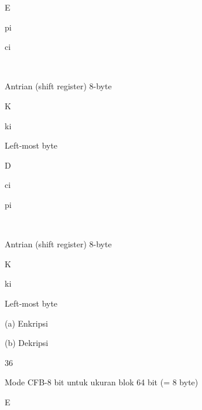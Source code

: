 \documentclass{article}
\begin{document}

E

pi

ci



Antrian (shift register) 8-byte

K

ki

Left-most byte

D

ci

pi



Antrian (shift register) 8-byte

K

ki

Left-most byte

(a) Enkripsi

(b) Dekripsi

36

Mode CFB-8 bit untuk ukuran blok 64 bit (= 8 byte)

E
\end{document}
